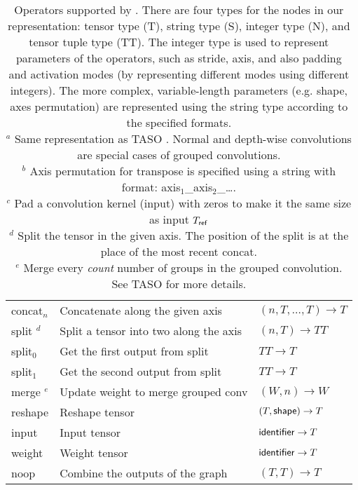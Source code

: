 \begin{table}[t]
\begin{tabular}{lll}
        \sf concat$_n$ & Concatenate along the given axis     & $(n, T, \dots, T) \rightarrow T$ \\
        \sf split $^d$      & Split a tensor into two along the axis & $(n, T) \rightarrow TT$ \\
        \sf split$_0$       & Get the first output from split      & $TT \rightarrow T$ \\
        \sf split$_1$       & Get the second output from split     & $TT \rightarrow T$ \\
        \sf merge $^e$      & Update weight to merge grouped conv  & $(W, n) \rightarrow W$ \\
        \sf reshape         & Reshape tensor                       & $(T, {\sf shape}) \rightarrow T$ \\
        \sf input           & Input tensor                         & ${\sf identifier} \rightarrow T$ \\
        \sf weight          & Weight tensor                        & ${\sf identifier} \rightarrow T$ \\
        \sf noop            & Combine the outputs of the graph     & $(T, T) \rightarrow T$ \\
    \end{tabular}
    \\[1em]
    \caption{
        Operators supported by \ourname.
        There are four types for the nodes in our representation:
        tensor type (T), string type (S), integer type (N), and tensor tuple type (TT).
        The integer type is used to represent parameters of the
         operators, such as stride, axis, and also padding and activation modes
         (by representing different modes using different integers).
         The more complex, variable-length parameters
          (e.g. shape, axes permutation) are represented using the
          string type according to the specified formats.
          \\[1em]
          \footnotesize{
            $^a$ Same representation as TASO \cite{taso}.
                 Normal and depth-wise convolutions are special cases
                 of grouped convolutions. \\
            $^b$ Axis permutation for transpose is specified
                 using a string with format: axis$_1$\_axis$_2$\_\dots .\\
            $^c$ Pad a convolution kernel (input) with
                 zeros to make it the same size as input $T_{\sf ref}$ \\
            $^d$ Split the tensor in the given axis. The position of the split is at the place of the most recent concat. \\
            $^e$ Merge every \textit{count} number of groups in the grouped convolution. See TASO \cite{taso} for more details. \\
          }
    }\label{table:ops}
\end{table}



